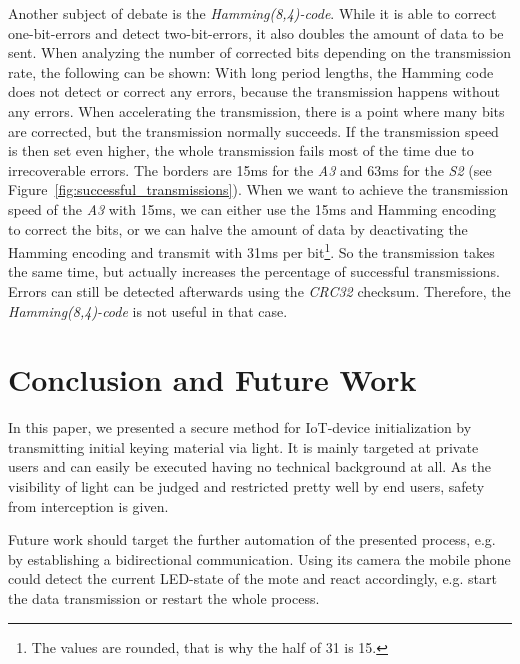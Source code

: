 \documentclass{sig-alternate} %
\begin{document}
Another subject of debate is the \textit{Hamming(8,4)-code}.
While it is able to correct one-bit-errors and detect two-bit-errors, it also doubles the amount of data to be sent.
When analyzing the number of corrected bits depending on the transmission rate, the following can be shown:
With long period lengths, the Hamming code does not detect or correct any errors, because the transmission happens without any errors.
When accelerating the transmission, there is a point where many bits are corrected, but the transmission normally succeeds.
If the transmission speed is then set even higher, the whole transmission fails most of the time due to irrecoverable errors.
The borders are 15ms for the \textit{A3} and 63ms for the \textit{S2} (see Figure~\ref{fig:successful_transmissions}).
When we want to achieve the transmission speed of the \textit{A3} with 15ms, we can either use the 15ms and Hamming encoding to correct the bits, or we can halve the amount of data by deactivating the Hamming encoding and transmit with 31ms per bit\footnote{The values are rounded, that is why the half of 31 is 15.}.
So the transmission takes the same time, but actually increases the percentage of successful transmissions.
Errors can still be detected afterwards using the \textit{CRC32} checksum.
Therefore, the \textit{Hamming(8,4)-code} is not useful in that case.



\section{Conclusion and Future Work}
\label{sec:future_work}

In this paper, we presented a secure method for IoT-device initialization by transmitting initial keying material via light.
It is mainly targeted at private users and can easily be executed having no technical background at all.
As the visibility of light can be judged and restricted pretty well by end users, safety from interception is given.

Future work should target the further automation of the presented process, e.g. by establishing a bidirectional communication.
Using its camera the mobile phone could detect the current LED-state of the mote and react accordingly, e.g. start the data transmission or restart the whole process.
\end{document}
